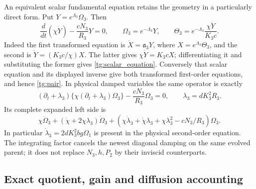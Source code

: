 An equivalent scalar fundamental equation retains the geometry in a
particularly direct form. Put $Y=e^{\Lambda_3}\Omega_3$. Then
\begin{equation}\label{tg:scalar_equation}
 \frac d{dt}(\chi\dot Y)-\frac{cN_3}{R_3}Y=0,
 \qquad
 \Omega_3=e^{-\Lambda_3}Y,\qquad
 \Theta_3=e^{-\Lambda_3}\frac{\chi\dot Y}{K_3c}.
\end{equation}
Indeed the first transformed equation is
$\dot X=\mathfrak a_3Y$, where $X=e^{\Lambda_3}\Theta_3$,
and the second is $\dot Y=(K_3c/\chi)X$. The latter gives
$\chi\dot Y=K_3cX$; differentiating it and substituting the former
gives \eqref{tg:scalar_equation}. Conversely that scalar equation
and its displayed inverse give both transformed first-order equations,
and hence \eqref{tg:pair}. In physical damped variables the same
operator is exactly
\begin{equation}\label{tg:damped_scalar}
 (\partial_t+\lambda_3)
       \{\chi(\partial_t+\lambda_3)\Omega_3\}
       -\frac{cN_3}{R_3}\Omega_3=0,
 \qquad \lambda_3=dK_3^2R_3.
\end{equation}
Its complete expanded left side is
\[
 \chi\ddot\Omega_3+(\dot\chi+2\chi\lambda_3)\dot\Omega_3+
 (\chi\dot\lambda_3+\dot\chi\lambda_3+\chi\lambda_3^2-cN_3/R_3)\Omega_3.
\]
In particular $\dot\lambda_3=2dK_3^2bg\Omega_1$ is present in
the physical second-order equation. The integrating factor cancels
the newest diagonal damping on the same evolved parent; it does not
replace $N_3,h,P_2$ by their inviscid counterparts.

\subsection{Exact quotient, gain and diffusion accounting}

